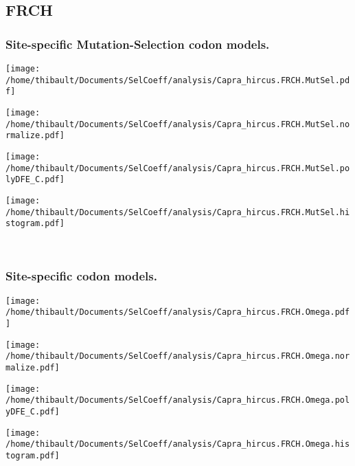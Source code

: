 \subsection{FRCH} 
 
\subsubsection*{Site-specific Mutation-Selection codon models.} 
\begin{minipage}{0.49\linewidth} 
\texttt{[image: /home/thibault/Documents/SelCoeff/analysis/Capra\_hircus.FRCH.MutSel.pdf]} 
\end{minipage}
\begin{minipage}{0.49\linewidth} 
\texttt{[image: /home/thibault/Documents/SelCoeff/analysis/Capra\_hircus.FRCH.MutSel.normalize.pdf]} 
\end{minipage}
\begin{minipage}{0.49\linewidth} 
\texttt{[image: /home/thibault/Documents/SelCoeff/analysis/Capra\_hircus.FRCH.MutSel.polyDFE\_C.pdf]} 
\end{minipage}
\begin{minipage}{0.49\linewidth} 
\texttt{[image: /home/thibault/Documents/SelCoeff/analysis/Capra\_hircus.FRCH.MutSel.histogram.pdf]} 
\end{minipage}
\\ 
\subsubsection*{Site-specific codon models.} 
\begin{minipage}{0.49\linewidth} 
\texttt{[image: /home/thibault/Documents/SelCoeff/analysis/Capra\_hircus.FRCH.Omega.pdf]} 
\end{minipage}
\begin{minipage}{0.49\linewidth} 
\texttt{[image: /home/thibault/Documents/SelCoeff/analysis/Capra\_hircus.FRCH.Omega.normalize.pdf]} 
\end{minipage}
\begin{minipage}{0.49\linewidth} 
\texttt{[image: /home/thibault/Documents/SelCoeff/analysis/Capra\_hircus.FRCH.Omega.polyDFE\_C.pdf]} 
\end{minipage}
\begin{minipage}{0.49\linewidth} 
\texttt{[image: /home/thibault/Documents/SelCoeff/analysis/Capra\_hircus.FRCH.Omega.histogram.pdf]} 
\end{minipage}
\\ 
